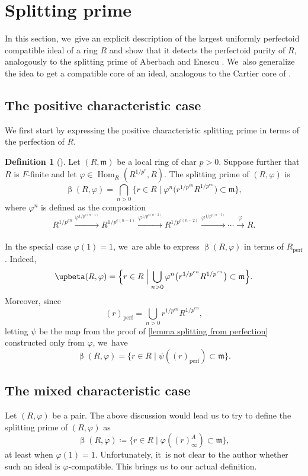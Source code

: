 \documentclass[JEP,XML,SOM,Unicode,published]{cedram}
\let\autoref\cref
\theoremstyle{plain}
\theoremstyle{definition}
\newtheorem{definition}[theorem]{Definition}
\numberwithin{equation}{theorem}
\newcommand{\fram}{\mathfrak{m}}
\DeclareMathOperator{\Hom}{Hom}
\newcommand{\perf}{_{\mathrm{perf}}}
\newcommand{\unpe}{{1/{p^e}}}
\renewcommand{\phi}{\varphi}
\newcommand{\rphi}{(R,\phi)}
\begin{document}
\section{Splitting prime}
In this section, we~give an explicit description of the largest uniformly perfectoid compatible ideal of a ring $R$ and show that it detects the perfectoid purity of $R$, analogously to the splitting prime of Aberbach and Enescu \cite{AberbachEnescuStructureOfFPure}. We~also generalize the idea to get a compatible core of an ideal, analogous to the Cartier core of \cite{BadillaCespedesFInvariantsSRRings,BrosowskyCartierCoreMap,CarvajalFayolleTameRamificationCFPS}.

\subsection{The positive characteristic case}
We first start by expressing the positive characteristic splitting prime in terms of the perfection of $R$.

\begin{definition}[{\cite{AberbachEnescuStructureOfFPure}}]
Let $(R,\fram)$ be a local ring of char $p>0$. Suppose further that $R$ is $F$-finite and let $\phi\in \Hom_R\left(R^\unpe,R\right)$. The splitting prime of $\rphi$ is
\[
\upbeta\rphi=\bigcap_{n>0} \bigl\{r\in R\mid \phi^n\bigl(r^{1/p^{en}}R^{1/p^{en}} \bigr)\subset \fram \bigr\},
\]
where $\phi^n$ is defined as the composition
\[
R^{1/p^{en}}\xrightarrow[]{\phi^{1/p^{e(n-1)}}}R^{1/p^{e(n-1)}}\xrightarrow[]{\phi^{1/p^{e(n-2)}}}R^{1/p^{e(n-2)}}\xrightarrow[]{\phi^{1/p^{e(n-3)}}}\cdots \xrightarrow[]{\phi} R.
\]
\end{definition}

In the special case $\phi(1)=1$, we~are able to express $\upbeta\rphi$ in terms of $R\perf$. Indeed,
\[
\upbeta\rphi = \Bigl\{r\in R \Bigm| \bigcup_{n>0}\phi^n\bigl(r^{1/p^{en}}R^{1/p^{en}}\bigr)\subset \fram \Bigr\}.
\]
Moreover, since
\[
(r)\perf=\bigcup_{n>0} r^{1/p^{en}}R^{1/p^{en}},
\]
letting $\psi$ be the map from the proof of \autoref{lemma splitting from perfection} constructed only from $\phi$, we~have
\[
\upbeta\rphi=\{r\in R\mid \psi((r)\perf)\subset \fram\}.
\]

\subsection{The mixed characteristic case}
Let $\rphi$ be a pair. The above discussion would lead us to try to define the splitting prime of $\rphi$ as
\[
\upbeta\rphi\coloneqq\{r\in R\mid \phi\left((r)_\infty^A\right)\subset \fram\},
\]
at least when $\phi(1)=1$.
Unfortunately, it~is not clear to the author whether such an ideal is $\phi$-compatible. This brings us to our actual definition.
\end{document}
